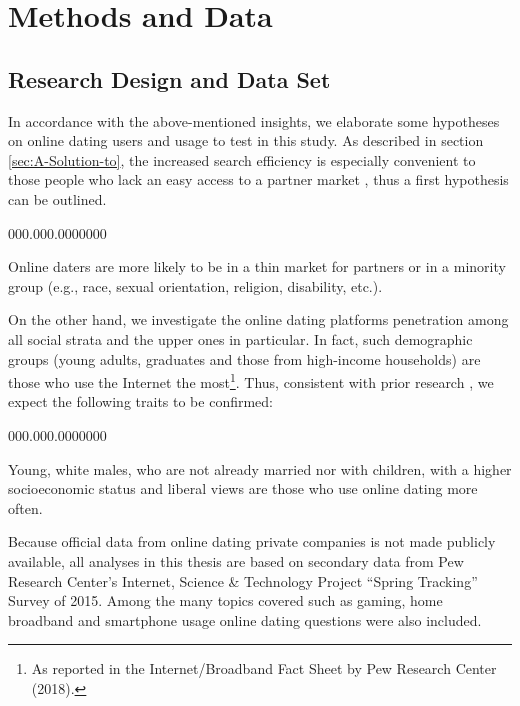 
\lhead[\leftmark]{\leftmark}

\rhead[\leftmark]{}

\lfoot{}

\cfoot{}

\cfoot[\thepage]{\thepage}

\chapter{Methods and Data}

\section{Research Design and Data Set}

In accordance with the above-mentioned insights, we elaborate some
hypotheses on online dating users and usage to test in this study.
As described in section \ref{sec:A-Solution-to}, the increased search
efficiency is especially convenient to those people who lack an easy
access to a partner market \citep[e.g.,][]{Stevenson2007Marriage-and-Di},
thus a first hypothesis can be outlined.
\begin{labeling}{000.000.0000000}
\item [{\textsl{Hypothesis\ 1}:}] Online daters are more likely to be
in a thin market for partners or in a minority group (e.g., race,
sexual orientation, religion, disability, etc.).
\end{labeling}
On the other hand, we investigate the online dating platforms penetration
among all social strata and the upper ones in particular. In fact,
such demographic groups (young adults, graduates and those from high-income
households) are those who use the Internet the most\footnote{As reported in the Internet/Broadband Fact Sheet by Pew Research Center
(2018).}. Thus, consistent with prior research \citep[e.g.,][]{Cacioppo2013Marital-satisfa},
we expect the following traits to be confirmed:
\begin{labeling}{000.000.0000000}
\item [{\textsl{Hypothesis\ 2}:}] Young, white males, who are not already
married nor with children, with a higher socioeconomic status and
liberal views are those who use online dating more often.
\end{labeling}
Because official data from online dating private companies is not
made publicly available, all analyses in this thesis are based on
secondary data from Pew Research Center\textquoteright s Internet,
Science \& Technology Project \textquotedblleft Spring Tracking\textquotedblright{}
Survey of 2015. Among the many topics covered \textendash{} such as
gaming, home broadband and smartphone usage \textendash{} online dating
questions were also included.

